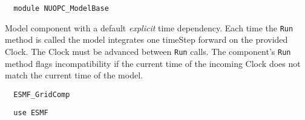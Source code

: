 
\setlength{\parskip}{0pt}
\setlength{\parindent}{0pt}
\setlength{\baselineskip}{11pt}
 
\def\bv{\begin{verbatim}}
\def\ev{\end{verbatim}}
\def\be{\begin{equation}}
\def\ee{\end{equation}}
\def\bea{\begin{eqnarray}}
\def\eea{\end{eqnarray}}
\def\bi{\begin{itemize}}
\def\ei{\end{itemize}}
\def\bn{\begin{enumerate}}
\def\en{\end{enumerate}}
\def\bd{\begin{description}}
\def\ed{\end{description}}
\def\({\left (}
\def\){\right )}
\def\[{\left [}
\def\]{\right ]}
\def\<{\left  \langle}
\def\>{\right \rangle}
\def\cI{{\cal I}}
\def\diag{\mathop{\rm diag}}
\def\tr{\mathop{\rm tr}}


\begin{verbatim}  module NUOPC_ModelBase
\end{verbatim}

Model component with a default {\em explicit} time dependency. Each time the {\tt Run} method is called the model integrates one timeStep forward on the provided Clock. The Clock must be advanced between {\tt Run} calls. The component's {\tt Run} method flags incompatibility if the current time of the incoming Clock does not match the current time of the model.

\begin{verbatim}  ESMF_GridComp
\end{verbatim}

\begin{verbatim}  use ESMF
\end{verbatim}


